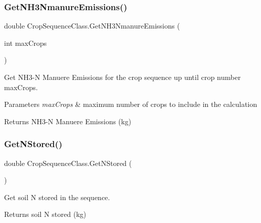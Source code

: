 \subsubsection{\texorpdfstring{GetNH3NmanureEmissions()}{GetNH3NmanureEmissions()}}
{\footnotesize\ttfamily double Crop\+Sequence\+Class.\+Get\+N\+H3\+Nmanure\+Emissions (\begin{DoxyParamCaption}\item[{int}]{max\+Crops }\end{DoxyParamCaption})\hspace{0.3cm}{\ttfamily [inline]}}



Get N\+H3-\/N Manuere Emissions for the crop sequence up until crop number max\+Crops. 


\begin{DoxyParams}{Parameters}
{\em max\+Crops} & maximum number of crops to include in the calculation \\
\hline
\end{DoxyParams}
\begin{DoxyReturn}{Returns}
N\+H3-\/N Manuere Emissions (kg) 
\end{DoxyReturn}
\mbox{\label{class_crop_sequence_class_ad9a5c0b00669854a028bdf5e683c4e17}} 
\subsubsection{\texorpdfstring{GetNStored()}{GetNStored()}}
{\footnotesize\ttfamily double Crop\+Sequence\+Class.\+Get\+N\+Stored (\begin{DoxyParamCaption}{ }\end{DoxyParamCaption})\hspace{0.3cm}{\ttfamily [inline]}}



Get soil N stored in the sequence. 

\begin{DoxyReturn}{Returns}
soil N stored (kg) 
\end{DoxyReturn}
\mbox{\label{class_crop_sequence_class_a5194164b45adf2baf7920142ce9af52d}} 
